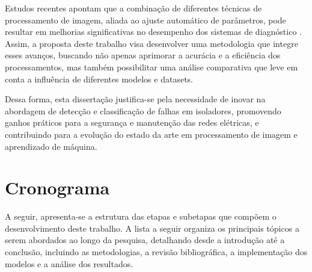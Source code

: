 Estudos recentes apontam que a combinação de diferentes técnicas de processamento de imagem, aliada ao ajuste automático de parâmetros, pode resultar em melhorias significativas no desempenho dos sistemas de diagnóstico \cite{Li2019}. Assim, a proposta deste trabalho visa desenvolver uma metodologia que integre esses avanços, buscando não apenas aprimorar a acurácia e a eficiência dos processamentos, mas também possibilitar uma análise comparativa que leve em conta a influência de diferentes modelos e datasets.

Dessa forma, esta dissertação justifica-se pela necessidade de inovar na abordagem de detecção e classificação de falhas em isoladores, promovendo ganhos práticos para a segurança e manutenção das redes elétricas, e contribuindo para a evolução do estado da arte em processamento de imagem e aprendizado de máquina.

\section{Cronograma}

A seguir, apresenta-se a estrutura das etapas e subetapas que compõem o desenvolvimento deste trabalho. A lista a seguir organiza os principais tópicos a serem abordados ao longo da pesquisa, detalhando desde a introdução até a conclusão, incluindo as metodologias, a revisão bibliográfica, a implementação dos modelos e a análise dos resultados.

